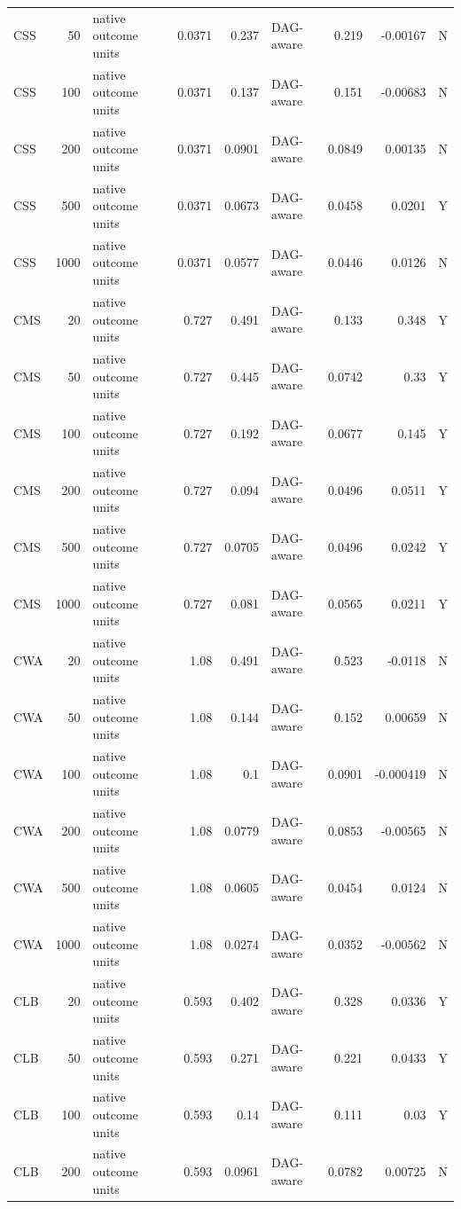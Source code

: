 \begin{tabular}{lrlrrlrrc}
CSS & 50 & native outcome units & 0.0371 & 0.237 & DAG-aware & 0.219 & -0.00167 & N \\
CSS & 100 & native outcome units & 0.0371 & 0.137 & DAG-aware & 0.151 & -0.00683 & N \\
CSS & 200 & native outcome units & 0.0371 & 0.0901 & DAG-aware & 0.0849 & 0.00135 & N \\
CSS & 500 & native outcome units & 0.0371 & 0.0673 & DAG-aware & 0.0458 & 0.0201 & Y \\
CSS & 1000 & native outcome units & 0.0371 & 0.0577 & DAG-aware & 0.0446 & 0.0126 & N \\
CMS & 20 & native outcome units & 0.727 & 0.491 & DAG-aware & 0.133 & 0.348 & Y \\
CMS & 50 & native outcome units & 0.727 & 0.445 & DAG-aware & 0.0742 & 0.33 & Y \\
CMS & 100 & native outcome units & 0.727 & 0.192 & DAG-aware & 0.0677 & 0.145 & Y \\
CMS & 200 & native outcome units & 0.727 & 0.094 & DAG-aware & 0.0496 & 0.0511 & Y \\
CMS & 500 & native outcome units & 0.727 & 0.0705 & DAG-aware & 0.0496 & 0.0242 & Y \\
CMS & 1000 & native outcome units & 0.727 & 0.081 & DAG-aware & 0.0565 & 0.0211 & Y \\
CWA & 20 & native outcome units & 1.08 & 0.491 & DAG-aware & 0.523 & -0.0118 & N \\
CWA & 50 & native outcome units & 1.08 & 0.144 & DAG-aware & 0.152 & 0.00659 & N \\
CWA & 100 & native outcome units & 1.08 & 0.1 & DAG-aware & 0.0901 & -0.000419 & N \\
CWA & 200 & native outcome units & 1.08 & 0.0779 & DAG-aware & 0.0853 & -0.00565 & N \\
CWA & 500 & native outcome units & 1.08 & 0.0605 & DAG-aware & 0.0454 & 0.0124 & N \\
CWA & 1000 & native outcome units & 1.08 & 0.0274 & DAG-aware & 0.0352 & -0.00562 & N \\
CLB & 20 & native outcome units & 0.593 & 0.402 & DAG-aware & 0.328 & 0.0336 & Y \\
CLB & 50 & native outcome units & 0.593 & 0.271 & DAG-aware & 0.221 & 0.0433 & Y \\
CLB & 100 & native outcome units & 0.593 & 0.14 & DAG-aware & 0.111 & 0.03 & Y \\
CLB & 200 & native outcome units & 0.593 & 0.0961 & DAG-aware & 0.0782 & 0.00725 & N \\

\end{tabular}
